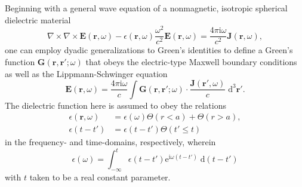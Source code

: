 \documentclass{article}
\begin{document}
Beginning with a general wave equation of a nonmagnetic, isotropic spherical dielectric material
\begin{equation}
\nabla\times\nabla\times\mathbf{E}(\mathbf{r},\omega) - \epsilon(\mathbf{r},\omega)\frac{\omega^2}{c^2}\mathbf{E}(\mathbf{r},\omega) = \frac{4\pi\mathrm{i}\omega}{c^2}\mathbf{J}(\mathbf{r},\omega),
\end{equation}
one can employ dyadic generalizations to Green's identities to define a Green's function $\mathbf{G}(\mathbf{r},\mathbf{r}';\omega)$ that obeys the electric-type Maxwell boundary conditions as well as the Lippmann-Schwinger equation
\begin{equation}
\mathbf{E}(\mathbf{r},\omega) = \frac{4\pi\mathrm{i}\omega}{c}\int\mathbf{G}(\mathbf{r},\mathbf{r}';\omega)\cdot\frac{\mathbf{J}(\mathbf{r}',\omega)}{c}\;\mathrm{d}^3\mathbf{r}'.
\end{equation}
The dielectric function here is assumed to obey the relations
\begin{equation}
\begin{split}
\epsilon(\mathbf{r},\omega) &= \epsilon(\omega)\Theta(r < a) + \Theta(r > a),\\
\epsilon(t - t') &= \epsilon(t - t')\Theta(t' \leq t)
\end{split}
\end{equation}
in the frequency- and time-domains, respectively, wherein
\begin{equation}
\epsilon(\omega) = \int_{-\infty}^t \epsilon(t - t')\mathrm{e}^{\mathrm{i}\omega(t - t')}\;\mathrm{d}(t-t')
\end{equation}
with $t$ taken to be a real constant parameter. 
\end{document}
